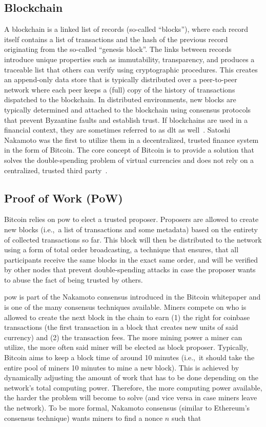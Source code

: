 \subsection{Blockchain}
\label{sec:background:blockchain}
A blockchain is a linked list of records (so-called ``blocks''), where each record itself contains a list of transactions and the hash of the previous record originating from the so-called ``genesis block''. The links between records introduce unique properties such as immutability, transparency, and produces a traceable list that others can verify using cryptographic procedures. This creates an append-only data store that is typically distributed over a peer-to-peer network where each peer keeps a (full) copy of the history of transactions dispatched to the blockchain. In distributed environments, new blocks are typically determined and attached to the blockchain using consensus protocols that prevent Byzantine faults and establish trust. If blockchains are used in a financial context, they are sometimes referred to as \gls{dlt} as well~\cite{consensus_comparison_2019,security_patterns_in_ethereum}. Satoshi Nakamoto was the first to utilize them in a decentralized, trusted finance system in the form of Bitcoin. The core concept of Bitcoin is to provide a solution that solves the double-spending problem of virtual currencies and does not rely on a centralized, trusted third party~\cite{nakamoto2009}.


\subsection{Proof of Work (PoW)}
\label{sec:background:pow}
Bitcoin relies on \gls{pow} to elect a trusted proposer. Proposers are allowed to create new blocks (i.e.,\ a list of transactions and some metadata) based on the entirety of collected transactions so far. This block will then be distributed to the network using a form of total order broadcasting, a technique that ensures, that all participants receive the same blocks in the exact same order, and will be verified by other nodes that prevent double-spending attacks in case the proposer wants to abuse the fact of being trusted by others.

\gls{pow} is part of the Nakamoto consensus introduced in the Bitcoin whitepaper and is one of the many consensus techniques available. Miners compete on who is allowed to create the next block in the chain to earn (1) the right for coinbase transactions (the first transaction in a block that creates new units of said currency) and (2) the transaction fees. The more mining power a miner can utilize, the more often said miner will be elected as block proposer. Typically, Bitcoin aims to keep a block time of around 10 minutes (i.e.,\ it should take the entire pool of miners 10 minutes to mine a new block). This is achieved by dynamically adjusting the amount of work that has to be done depending on the network's total computing power. Therefore, the more computing power available, the harder the problem will become to solve (and vice versa in case miners leave the network). To be more formal, Nakamoto consensus (similar to Ethereum's consensus technique) wants miners to find a nonce $n$ such that

